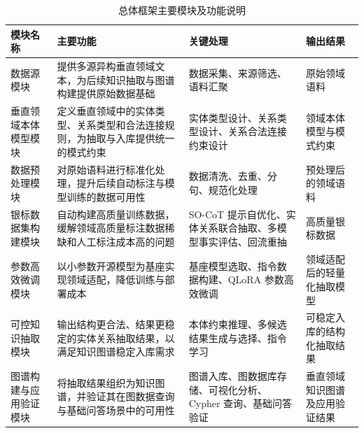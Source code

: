 \begin{table}[htbp]
  \centering
  \caption{总体框架主要模块及功能说明}
  \label{tab:framework_modules}
  {\renewcommand{\arraystretch}{1.18}
  \small
  \begin{tabularx}{0.96\textwidth}{
    >{\raggedright\arraybackslash}p{}
    >{\raggedright\arraybackslash}X
    >{\raggedright\arraybackslash}X
    >{\raggedright\arraybackslash}p{}
  }
    \toprule
    模块名称 & 主要功能 & 关键处理 & 输出结果 \\
    \midrule

    数据源模块
    & 提供多源异构垂直领域文本，为后续知识抽取与图谱构建提供原始数据基础
    & 数据采集、来源筛选、语料汇聚
    & 原始领域语料
    \\

    垂直领域本体模型模块
    & 定义垂直领域中的实体类型、关系类型和合法连接规则，为抽取与入库提供统一的模式约束
    & 实体类型设计、关系类型设计、关系合法连接约束设计
    & 领域本体模型与模式约束
    \\

    数据预处理模块
    & 对原始语料进行标准化处理，提升后续自动标注与模型训练的数据可用性
    & 数据清洗、去重、分句、规范化处理
    & 预处理后的领域语料
    \\

    银标数据集构建模块
    & 自动构建高质量训练数据，缓解领域高质量标注数据稀缺和人工标注成本高的问题
    & SO-CoT 提示自优化、实体关系联合抽取、多模型事实评估、回流重抽
    & 高质量银标数据
    \\

    参数高效微调模块
    & 以小参数开源模型为基座实现领域适配，降低训练与部署成本
    & 基座模型选取、指令数据构建、QLoRA 参数高效微调
    & 领域适配后的轻量化抽取模型
    \\

    可控知识抽取模块
    & 输出结构更合法、结果更稳定的实体关系抽取结果，以满足知识图谱稳定入库需求
    & 本体约束推理、多候选结果生成与选择、指令学习
    & 可稳定入库的结构化抽取结果
    \\

    图谱构建与应用验证模块
    & 将抽取结果组织为知识图谱，并验证其在图数据查询与基础问答场景中的可用性
    & 图谱入库、图数据库存储、可视化分析、Cypher 查询、基础问答验证
    & 垂直领域知识图谱及应用验证结果
    \\

    \bottomrule
  \end{tabularx}}
\end{table}

